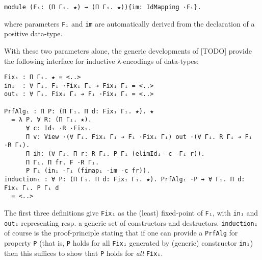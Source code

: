 \documentclass{article}
\begin{document}
\begin{verbatim}
module (Fᵢ: (Π Γᵢ. ★) → (Π Γᵢ. ★)){im: IdMapping ·Fᵢ}.
\end{verbatim}

\noindent where parameters \verb;Fᵢ; and \verb;im; are automatically derived from the
declaration of a positive data-type.

With these two parameters alone, the generic developments of [TODO] provide the
following interface for inductive λ-encodings of data-types:

\begin{verbatim}
Fixᵢ : Π Γᵢ. ★ = <..>
inᵢ  : ∀ Γᵢ. Fᵢ ·Fixᵢ Γᵢ ➔ Fixᵢ Γᵢ = <..>
outᵢ : ∀ Γᵢ. Fixᵢ Γᵢ ➔ Fᵢ ·Fixᵢ Γᵢ = <..>

PrfAlgᵢ : Π P: (Π Γᵢ. Π d: Fixᵢ Γᵢ. ★). ★
  = λ P. ∀ R: (Π Γᵢ. ★).
      ∀ c: Idᵢ ·R ·Fixᵢ.
      Π v: View ·(∀ Γᵢ. Fixᵢ Γᵢ ➔ Fᵢ ·Fixᵢ Γᵢ) out ·(∀ Γᵢ. R Γᵢ ➔ Fᵢ ·R Γᵢ).
      Π ih: (∀ Γᵢ. Π r: R Γᵢ. P Γᵢ (elimIdᵢ -c -Γᵢ r)).
      Π Γᵢ. Π fr. F ·R Γᵢ.
      P Γᵢ (inᵢ -Γᵢ (fimapᵢ -im -c fr)).
inductionᵢ : ∀ P: (Π Γᵢ. Π d: Fixᵢ Γᵢ. ★). PrfAlgᵢ ·P ➔ ∀ Γᵢ. Π d: Fixᵢ Γᵢ. P Γᵢ d
  = <..>
\end{verbatim}

The first three definitions give \verb;Fixᵢ; as the (least) fixed-point of
\verb;Fᵢ;, with \verb;inᵢ; and \verb;outᵢ; representing resp. a generic set of
constructors and destructors. \verb;inductionᵢ; of course is the proof-principle
stating that if one can provide a \verb;PrfAlg; for property \verb;P; (that is,
\verb;P; holds for all \verb;Fixᵢ; generated by (generic) constructor
\verb;inᵢ;) then this suffices to show that \verb;P; holds for \textit{all}
\verb;Fixᵢ;.
\end{document}
